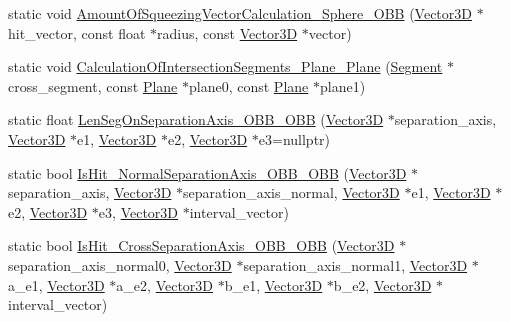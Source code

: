 \begin{DoxyCompactItemize}
\item 
static void \mbox{\hyperlink{class_collision_judgment_a0d9af21fba97d2f396c8200b6fccaeb4}{Amount\+Of\+Squeezing\+Vector\+Calculation\+\_\+\+Sphere\+\_\+\+O\+BB}} (\mbox{\hyperlink{class_vector3_d}{Vector3D}} $\ast$hit\+\_\+vector, const float $\ast$radius, const \mbox{\hyperlink{class_vector3_d}{Vector3D}} $\ast$vector)
\item 
static void \mbox{\hyperlink{class_collision_judgment_ab454b739b07f965ae4c3c94c53357b45}{Calculation\+Of\+Intersection\+Segments\+\_\+\+Plane\+\_\+\+Plane}} (\mbox{\hyperlink{class_segment}{Segment}} $\ast$cross\+\_\+segment, const \mbox{\hyperlink{class_plane}{Plane}} $\ast$plane0, const \mbox{\hyperlink{class_plane}{Plane}} $\ast$plane1)
\item 
static float \mbox{\hyperlink{class_collision_judgment_ac9e908375427b6b00bd82e2f5a5b034a}{Len\+Seg\+On\+Separation\+Axis\+\_\+\+O\+B\+B\+\_\+\+O\+BB}} (\mbox{\hyperlink{class_vector3_d}{Vector3D}} $\ast$separation\+\_\+axis, \mbox{\hyperlink{class_vector3_d}{Vector3D}} $\ast$e1, \mbox{\hyperlink{class_vector3_d}{Vector3D}} $\ast$e2, \mbox{\hyperlink{class_vector3_d}{Vector3D}} $\ast$e3=nullptr)
\item 
static bool \mbox{\hyperlink{class_collision_judgment_abb475bce4c67d02d0964355aa60f1362}{Is\+Hit\+\_\+\+Normal\+Separation\+Axis\+\_\+\+O\+B\+B\+\_\+\+O\+BB}} (\mbox{\hyperlink{class_vector3_d}{Vector3D}} $\ast$separation\+\_\+axis, \mbox{\hyperlink{class_vector3_d}{Vector3D}} $\ast$separation\+\_\+axis\+\_\+normal, \mbox{\hyperlink{class_vector3_d}{Vector3D}} $\ast$e1, \mbox{\hyperlink{class_vector3_d}{Vector3D}} $\ast$e2, \mbox{\hyperlink{class_vector3_d}{Vector3D}} $\ast$e3, \mbox{\hyperlink{class_vector3_d}{Vector3D}} $\ast$interval\+\_\+vector)
\item 
static bool \mbox{\hyperlink{class_collision_judgment_a86d5dd5817ff244d22c9efa3eeecbcb7}{Is\+Hit\+\_\+\+Cross\+Separation\+Axis\+\_\+\+O\+B\+B\+\_\+\+O\+BB}} (\mbox{\hyperlink{class_vector3_d}{Vector3D}} $\ast$separation\+\_\+axis\+\_\+normal0, \mbox{\hyperlink{class_vector3_d}{Vector3D}} $\ast$separation\+\_\+axis\+\_\+normal1, \mbox{\hyperlink{class_vector3_d}{Vector3D}} $\ast$a\+\_\+e1, \mbox{\hyperlink{class_vector3_d}{Vector3D}} $\ast$a\+\_\+e2, \mbox{\hyperlink{class_vector3_d}{Vector3D}} $\ast$b\+\_\+e1, \mbox{\hyperlink{class_vector3_d}{Vector3D}} $\ast$b\+\_\+e2, \mbox{\hyperlink{class_vector3_d}{Vector3D}} $\ast$interval\+\_\+vector)
\end{DoxyCompactItemize}



